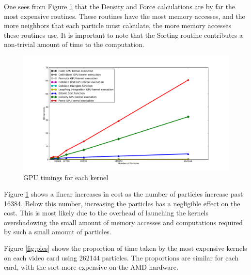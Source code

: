 \pagebreak
One sees from Figure \ref{fig:kernel_time} that the Density and Force calculations are by far
the most expensive routines. These routines have the most memory accesses, and
the more neighbors that each particle must calculate, the more memory accesses
these routines use. It is important to note that the Sorting routine
contributes a non-trivial amount of time to the computation.


\begin{figure}[!htc]
 		\centering
		\includegraphics[scale=0.4]{figures/nv_kernel_num.png}
        \caption{ GPU timings for each kernel }
        \label{fig:kernel_time}
\end{figure}

Figure \ref{fig:kernel_time} shows a linear increases in cost as the number of
particles increase past 16384. Below this number, increasing the particles has a
negligible effect on the cost. This is most likely due to the overhead of
launching the kernels overshadowing the small amount of memory accesses and
computations required by such a small amount of particles. 

\pagebreak

Figure \ref{fig:pies} shows the proportion of time taken by the most expensive
kernels on each video card using 262144 particles. The proportions are similar
for each card, with the sort more expensive on the AMD hardware.

